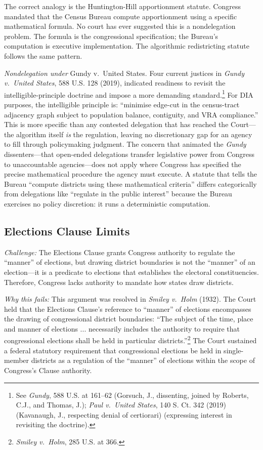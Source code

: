 The correct analogy is the Huntington-Hill apportionment statute. Congress mandated that the Census Bureau compute apportionment using a specific mathematical formula. No court has ever suggested this is a nondelegation problem. The formula is the congressional specification; the Bureau's computation is executive implementation. The algorithmic redistricting statute follows the same pattern.

\textit{Nondelegation under} Gundy v.\ United States. Four current justices in \textit{Gundy v.\ United States}, 588 U.S. 128 (2019), indicated readiness to revisit the intelligible-principle doctrine and impose a more demanding standard.\footnote{See \textit{Gundy}, 588 U.S. at 161--62 (Gorsuch, J., dissenting, joined by Roberts, C.J., and Thomas, J.); \textit{Paul v.\ United States}, 140 S. Ct. 342 (2019) (Kavanaugh, J., respecting denial of certiorari) (expressing interest in revisiting the doctrine).} For DIA purposes, the intelligible principle is: ``minimise edge-cut in the census-tract adjacency graph subject to population balance, contiguity, and VRA compliance.'' This is more specific than any contested delegation that has reached the Court---the algorithm itself \textit{is} the regulation, leaving no discretionary gap for an agency to fill through policymaking judgment. The concern that animated the \textit{Gundy} dissenters---that open-ended delegations transfer legislative power from Congress to unaccountable agencies---does not apply where Congress has specified the precise mathematical procedure the agency must execute. A statute that tells the Bureau ``compute districts using these mathematical criteria'' differs categorically from delegations like ``regulate in the public interest'' because the Bureau exercises no policy discretion: it runs a deterministic computation.

\subsection{Elections Clause Limits}

\textit{Challenge:} The Elections Clause grants Congress authority to regulate the ``manner'' of elections, but drawing district boundaries is not the ``manner'' of an election---it is a predicate to elections that establishes the electoral constituencies. Therefore, Congress lacks authority to mandate how states draw districts.

\textit{Why this fails:} This argument was resolved in \textit{Smiley v.\ Holm} (1932). The Court held that the Elections Clause's reference to ``manner'' of elections encompasses the drawing of congressional district boundaries: ``The subject of the time, place and manner of elections ... necessarily includes the authority to require that congressional elections shall be held in particular districts.''\footnote{\textit{Smiley v.\ Holm}, 285 U.S. at 366.} The Court sustained a federal statutory requirement that congressional elections be held in single-member districts as a regulation of the ``manner'' of elections within the scope of Congress's Clause authority.


